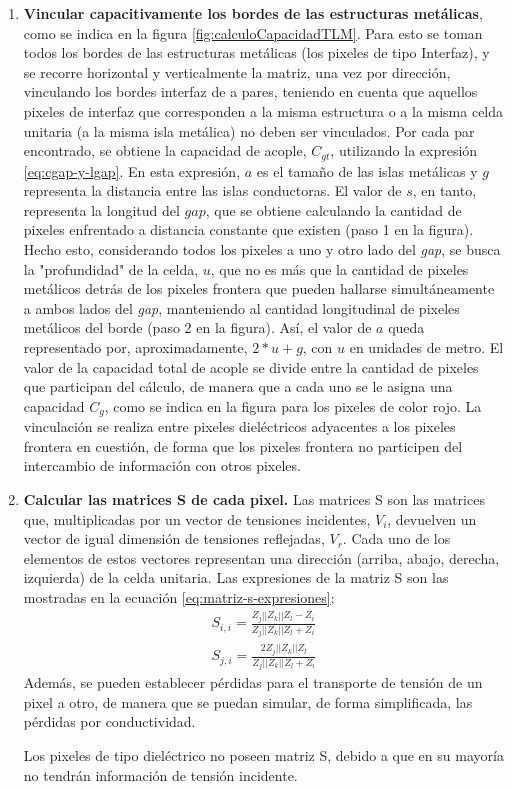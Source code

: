 \begin{enumerate}
	\item \textbf{Vincular capacitivamente los bordes de las estructuras metálicas}, como se indica en la figura \ref{fig:calculoCapacidadTLM}. Para esto se toman todos los bordes de las estructuras metálicas (los pixeles de tipo Interfaz), y se recorre horizontal y verticalmente la matriz, una vez por dirección, vinculando los bordes interfaz de a pares, teniendo en cuenta que aquellos pixeles de interfaz que corresponden a la misma estructura o a la misma celda unitaria (a la misma isla metálica) no deben ser vinculados. Por cada par encontrado, se obtiene la capacidad de acople, $C_{gt}$, utilizando la expresión \ref{eq:cgap-y-lgap}. En esta expresión, $a$ es el tamaño de las islas metálicas y $g$ representa la distancia entre las islas conductoras. El valor de $s$, en tanto, representa la longitud del $gap$, que se obtiene calculando la cantidad de pixeles enfrentado a distancia constante que existen (paso 1 en la figura). Hecho esto, considerando todos los pixeles a uno y otro lado del \textit{gap}, se busca la "profundidad" de la celda, $u$, que no es más que la cantidad de pixeles metálicos detrás de los pixeles frontera que pueden hallarse simultáneamente a ambos lados del \textit{gap}, manteniendo al cantidad longitudinal de pixeles metálicos del borde (paso 2 en la figura). Así, el valor de $a$ queda representado por, aproximadamente, $2*u+g$, con $u$ en unidades de metro. El valor de la capacidad total de acople se divide entre la cantidad de pixeles que participan del cálculo, de manera que a cada uno se le asigna una capacidad $C_g$, como se indica en la figura para los pixeles de color rojo. La vinculación se realiza entre pixeles dieléctricos adyacentes a los pixeles frontera en cuestión, de forma que los pixeles frontera no participen del intercambio de información con otros pixeles.
	
	\item \textbf{Calcular las matrices S de cada pixel.} Las matrices S son las matrices que, multiplicadas por un vector de tensiones incidentes, $V_i$, devuelven un vector de igual dimensión de tensiones reflejadas, $V_r$. Cada uno de los elementos de estos vectores representan una dirección (arriba, abajo, derecha, izquierda) de la celda unitaria. Las expresiones de la matriz S son las mostradas en la ecuación \ref{eq:matriz-s-expresiones}:
	\begin{subequations}
		\label{eq:matriz-s-expresiones}
		\begin{align}
			S_{i,i} = \frac{Z_{j}||Z_{k}||Z_{l} -Z_{i}}{Z_{j}||Z_{k}||Z_{l} +Z_{i}} \\
			S_{j,i} = \frac{2 Z_{j}||Z_{k}||Z_{l}}{Z_{j}||Z_{k}||Z_{l} +Z_{i}}
		\end{align}
	\end{subequations}
	Además, se pueden establecer pérdidas para el transporte de tensión de un pixel a otro, de manera que se puedan simular, de forma simplificada, las pérdidas por conductividad.
	
	Los pixeles de tipo dieléctrico no poseen matriz S, debido a que en su mayoría no tendrán información de tensión incidente.
\end{enumerate}
	
